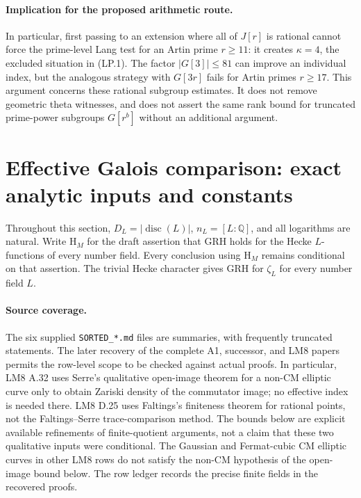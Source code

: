 \documentclass[11pt,a4paper]{article}
\begin{document}
\paragraph{Implication for the proposed arithmetic route.}
In particular, first passing to an extension where all of
$J[r]$ is rational cannot force the prime-level Lang test
for an Artin prime $r\ge11$: it creates $\kappa=4$, the
excluded situation in (LP.1).
The factor $|G[3]|\le81$ can improve an individual index,
but the analogous strategy with $G[3r]$ fails for Artin
primes $r\ge17$.
This argument concerns these rational subgroup estimates.
It does not remove geometric theta witnesses, and does not
assert the same rank bound for truncated prime-power
subgroups $G[r^b]$ without an additional argument.


\section{Effective Galois comparison: exact analytic inputs and constants}
\label{sec:effective-galois}

Throughout this section, $D_L=|\operatorname{disc}(L)|$, $n_L=[L:\mathbb Q]$, and all logarithms are natural.  Write $\mathrm{H}_M$ for the draft assertion that GRH holds for the Hecke $L$-functions of every number field.  Every conclusion using $\mathrm{H}_M$ remains conditional on that assertion.  The trivial Hecke character gives GRH for $\zeta_L$ for every number field $L$.

\paragraph{Source coverage.}
The six supplied \texttt{SORTED\_*.md} files are summaries, with frequently truncated statements.  The later recovery of the complete A1, successor, and LM8 papers permits the row-level scope to be checked against actual proofs.  In particular, LM8 A.32 uses Serre's qualitative open-image theorem for a non-CM elliptic curve only to obtain Zariski density of the commutator image; no effective index is needed there.  LM8 D.25 uses Faltings's finiteness theorem for rational points, not the Faltings--Serre trace-comparison method.  The bounds below are explicit available refinements of finite-quotient arguments, not a claim that these two qualitative inputs were conditional.  The Gaussian and Fermat-cubic CM elliptic curves in other LM8 rows do not satisfy the non-CM hypothesis of the open-image bound below.  The row ledger records the precise finite fields in the recovered proofs.
\end{document}
